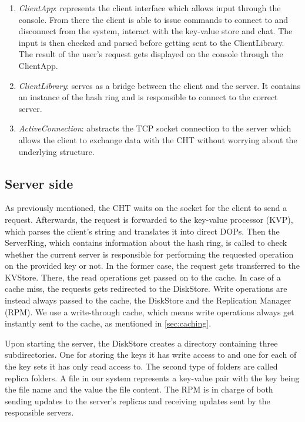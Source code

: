 \begin{enumerate} 
  \item \textit{ClientApp}: represents the client interface which allows input through the console. From there the client is able to issue commands to connect to and disconnect from the system, interact with the key-value store and chat. The input is then checked and parsed before getting sent to the ClientLibrary. The result of the user's request gets displayed on the console through the ClientApp.
  \item \textit{ClientLibrary}: serves as a bridge between the client and the server. It contains an instance of the hash ring and is responsible to connect to the correct server.
  \item \textit{ActiveConnection}: abstracts the TCP socket connection to the server which allows the client to exchange data with the CHT without worrying about the underlying structure.
\end{enumerate}
 
\subsection{Server side}
\label{sec:server_side}

As previously mentioned, the CHT waits on the socket for the client to send a request. Afterwards, the request is forwarded to the key-value processor (KVP), which parses the client's string and translates it into direct DOPs. Then the ServerRing, which contains information about the hash ring, is called to check whether the current server is responsible for performing the requested operation on the provided key or not. In the former case, the request gets transferred to the KVStore. There, the read operations get passed on to the cache. In case of a cache miss, the requests gets redirected to the DiskStore. Write operations are instead always passed to the cache, the DiskStore and the Replication Manager (RPM). We use a write-through cache, which means write operations always get instantly sent to the cache, as mentioned in \ref{sec:caching}.

Upon starting the server, the DiskStore creates a directory containing three subdirectories. One for storing the keys it has write access to and one for each of the key sets it has only read access to. The second type of folders are called replica folders. A file in our system represents a key-value pair with the key being the file name and the value the file content.
The RPM is in charge of both sending updates to the server's replicas and receiving updates sent by the responsible servers.

